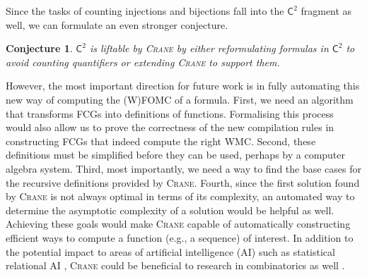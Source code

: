 \documentclass[letterpaper]{article} %
\newcommand{\Ctwo}{$\mathsf{C}^{2}$}
\newtheorem{conjecture}{Conjecture}
\theoremstyle{definition}
\begin{document}
Since the tasks of counting injections and bijections fall into the \Ctwo{}
fragment as well, we can formulate an even stronger conjecture.

\begin{conjecture}
  \Ctwo{} is liftable by \textsc{Crane} by either reformulating formulas in
  \Ctwo{} to avoid counting quantifiers or extending \textsc{Crane} to support
  them.
\end{conjecture}

However, the most important direction for future work is in fully automating
this new way of computing the (W)FOMC of a formula. First, we need an algorithm
that transforms FCGs into definitions of functions. Formalising this process
would also allow us to prove the correctness of the new compilation rules in
constructing FCGs that indeed compute the right WMC\@. Second, these definitions
must be simplified before they can be used, perhaps by a computer algebra
system. Third, most importantly, we need a way to find the base cases for the
recursive definitions provided by \textsc{Crane}. Fourth, since the first
solution found by \textsc{Crane} is not always optimal in terms of its
complexity, an automated way to determine the asymptotic complexity of a
solution would be helpful as well. Achieving these goals would make
\textsc{Crane} capable of automatically constructing efficient ways to compute a
function (e.g., a sequence) of interest. In addition to the potential impact to
areas of artificial intelligence (AI) such as statistical relational AI
\citep{DBLP:series/synthesis/2016Raedt}, \textsc{Crane} could be beneficial to
research in combinatorics as well \citep{DBLP:conf/ilp/BarvinekB0ZK21}.


\end{document}
